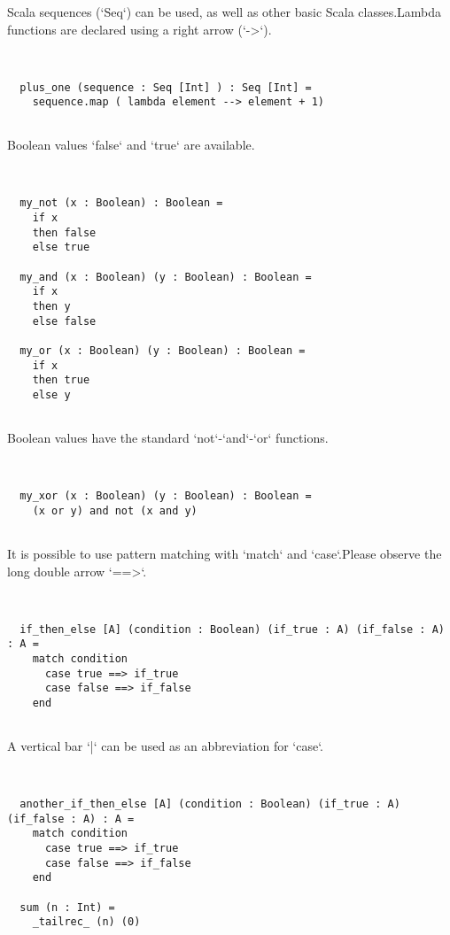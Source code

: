 \documentclass[12pt,a4paper]{article}
\begin{document}
Scala sequences (`Seq`) can be used, as well as other basic Scala classes.Lambda functions are declared using a right arrow (`->`). 


\begin{lstlisting}


  plus_one (sequence : Seq [Int] ) : Seq [Int] =
    sequence.map ( lambda element --> element + 1)


\end{lstlisting}

Boolean values `false` and `true` are available. 


\begin{lstlisting}


  my_not (x : Boolean) : Boolean =
    if x
    then false
    else true

  my_and (x : Boolean) (y : Boolean) : Boolean =
    if x
    then y
    else false

  my_or (x : Boolean) (y : Boolean) : Boolean =
    if x
    then true
    else y


\end{lstlisting}

Boolean values have the standard `not`-`and`-`or` functions. 


\begin{lstlisting}


  my_xor (x : Boolean) (y : Boolean) : Boolean =
    (x or y) and not (x and y)


\end{lstlisting}

It is possible to use pattern matching with `match` and `case`.Please observe the long double arrow `==>`. 


\begin{lstlisting}


  if_then_else [A] (condition : Boolean) (if_true : A) (if_false : A) : A =
    match condition
      case true ==> if_true
      case false ==> if_false
    end


\end{lstlisting}

A vertical bar `|` can be used as an abbreviation for `case`. 


\begin{lstlisting}


  another_if_then_else [A] (condition : Boolean) (if_true : A) (if_false : A) : A =
    match condition
      case true ==> if_true
      case false ==> if_false
    end

  sum (n : Int) =
    _tailrec_ (n) (0)


\end{lstlisting}
\end{document}
